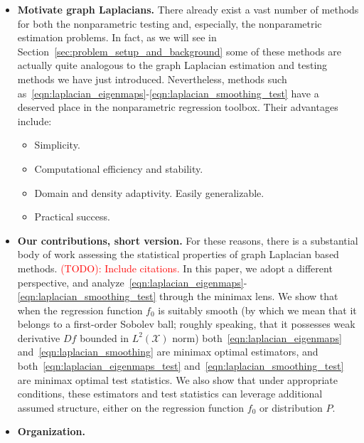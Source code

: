 \documentclass{article}
\newcommand{\1}{\mathbf{1}}
\newcommand{\Xset}{\mathcal{X}}
\theoremstyle{alden}
\theoremstyle{aldenthm}
\theoremstyle{definition}
\theoremstyle{remark}
\begin{document}
\begin{itemize}
	\item \textbf{Motivate graph Laplacians.} There already exist a vast number of methods for both the nonparametric testing and, especially, the nonparametric estimation problems. In fact, as we will see in Section~\ref{sec:problem_setup_and_background} some of these methods are actually quite analogous to the graph Laplacian estimation and testing methods we have just introduced. Nevertheless, methods such as~\eqref{eqn:laplacian_eigenmaps}-\eqref{eqn:laplacian_smoothing_test} have a deserved place in the nonparametric regression toolbox. Their advantages include:
	\begin{itemize}
		\item Simplicity.
		\item Computational efficiency and stability.
		\item Domain and density adaptivity. Easily generalizable. 
		\item Practical success.
	\end{itemize}
	\item \textbf{Our contributions, short version.} For these reasons, there is a  substantial body of work assessing the statistical properties of graph Laplacian based methods. \textcolor{red}{(TODO): Include citations.} In this paper, we adopt a different perspective, and analyze~\eqref{eqn:laplacian_eigenmaps}-\eqref{eqn:laplacian_smoothing_test} through the minimax lens. We show that when the regression function $f_0$ is suitably smooth (by which we mean that it belongs to a first-order Sobolev ball; roughly speaking, that it possesses weak derivative $Df$ bounded in $L^2(\Xset)$ norm) both~\eqref{eqn:laplacian_eigenmaps} and~\eqref{eqn:laplacian_smoothing} are minimax optimal estimators, and both~\eqref{eqn:laplacian_eigenmaps_test} and~\eqref{eqn:laplacian_smoothing_test} are minimax optimal test statistics. We also show that under appropriate conditions, these estimators and test statistics can leverage additional assumed structure, either on the regression function $f_0$ or distribution $P$.
	\item \textbf{Organization.}
\end{itemize}
\end{document}

